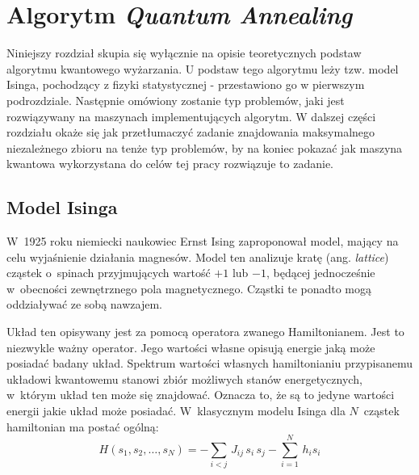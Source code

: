 \documentclass[12pt,a4paper,twoside,openany]{book}
\begin{document}
\chapter{Algorytm \textit{Quantum Annealing}}

Niniejszy rozdział skupia się wyłącznie na opisie teoretycznych podstaw algorytmu kwantowego wyżarzania. U podstaw tego algorytmu leży tzw. model Isinga, pochodzący z fizyki statystycznej - przestawiono go w pierwszym podrozdziale. Następnie omówiony zostanie typ problemów, jaki jest rozwiązywany na maszynach implementujących algorytm.  W dalszej części rozdziału okaże się jak przetłumaczyć zadanie znajdowania maksymalnego niezależnego zbioru na tenże typ problemów, by na koniec pokazać jak maszyna kwantowa wykorzystana do celów tej pracy rozwiązuje to zadanie.

\section{Model Isinga}

W~1925 roku niemiecki naukowiec Ernst Ising zaproponował model, mający na celu wyjaśnienie działania magnesów.
Model ten analizuje kratę (ang. \textit{lattice}) cząstek o~spinach przyjmujących wartość $+1$ lub $-1$, będącej jednocześnie w~obecności zewnętrznego pola magnetycznego. 
Cząstki te ponadto mogą oddziaływać ze sobą nawzajem. 

Układ ten opisywany jest za pomocą operatora zwanego Hamiltonianem. 
Jest to niezwykle ważny operator. 
Jego wartości własne opisują energie jaką może posiadać badany układ. 
Spektrum wartości własnych hamiltonianiu przypisanemu układowi kwantowemu stanowi zbiór możliwych stanów energetycznych, w~którym układ ten może się znajdować. 
Oznacza to, że są to jedyne wartości energii jakie układ może posiadać. 
W~klasycznym modelu Isinga dla $N$~cząstek hamiltonian ma postać ogólną\citep{}:
\begin{equation}
    H(s_{1}, s_{2},\dots, s_{N}) = -\sum_{i < j}\, J_{ij}\,s_{i}\,s_{j} - \sum^N_{i=1}\, h_{i} s_{i}
\end{equation}
\end{document}
